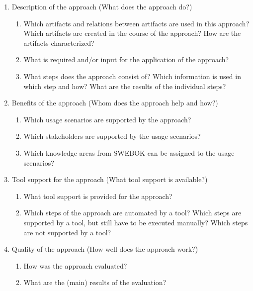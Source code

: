 \begin{enumerate}
	\item Description of the approach (What does the approach do?)
	\begin{enumerate}
		\item Which artifacts and relations between artifacts are used in this approach? Which artifacts are created in the course of the approach? How are the artifacts characterized?
		\item What is required and/or input for the application of the approach?
		\item What steps does the approach consist of? Which information is used in which step and how? What are the results of the individual steps?
	\end{enumerate}
	\item Benefits of the approach (Whom does the approach help and how?)
	\begin{enumerate}
		\item Which usage scenarios are supported by the approach?
		\item Which stakeholders are supported by the usage scenarios?
		\item Which knowledge areas from SWEBOK can be assigned to the usage scenarios?
	\end{enumerate}
	\item Tool support for the approach (What tool support is available?)
	\begin{enumerate}
		\item What tool support is provided for the approach?
		\item Which steps of the approach are automated by a tool? Which steps are supported by a tool, but still have to be executed manually? Which steps are not supported by a tool?
	\end{enumerate}
	\item Quality of the approach (How well does the approach work?)
	\begin{enumerate}
		\item How was the approach evaluated?
		\item What are the (main) results of the evaluation?
	\end{enumerate}
\end{enumerate}


